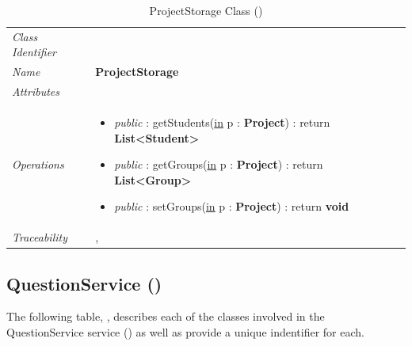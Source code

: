 \documentclass[12pt,letterpaper]{article}
\begin{document}
\begin{table}[H]
    \caption{ProjectStorage Class ()} 
	\begin{tabu} to 
		\toprule
		Class Identifier &  \\
		Name & {\bf ProjectStorage} \\
		Attributes & \\

		Operations &
		\begin{minipage}[t]{\linewidth}
			\begin{itemize}
			    \item {\it public} : getStudents(\underline{in} p : {\bf Project}) : return {\bf List<Student>}
			    \item {\it public} : getGroups(\underline{in} p : {\bf Project}) : return {\bf List<Group>}
			    \item {\it public} : setGroups(\underline{in} p : {\bf Project}) : return {\bf void}
	        \end{itemize}
	    \end{minipage} \\
	    	Traceability & , \\
		\toprule
	\end{tabu}
\end{table}

\subsection{QuestionService ()}

The following table, , describes each of the classes involved in the QuestionService service () as well as provide a unique indentifier for each.
\end{document}
